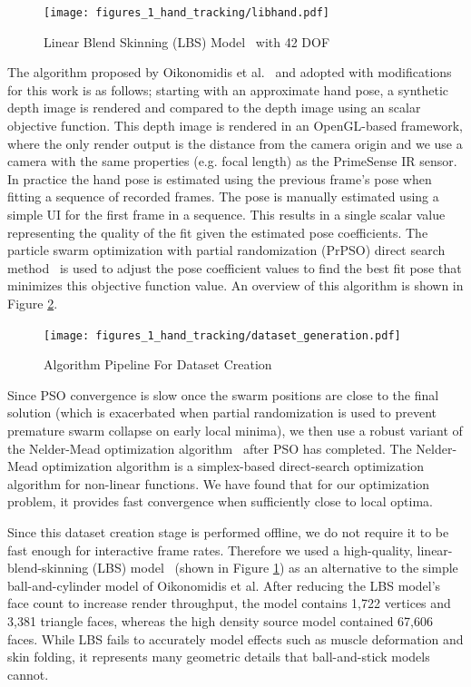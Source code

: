 \begin{figure}[ht]
\centering
\texttt{[image: figures\_1\_hand\_tracking/libhand.pdf]}
    \caption{Linear Blend Skinning (LBS) Model~\protect\cite{libhand} with 42 DOF}
    \label{fig:libhand}
\end{figure}

The algorithm proposed by Oikonomidis et al.~\cite{bmvc2011oikonom} and adopted with modifications for this work is as follows; starting with an approximate hand pose, a synthetic depth image is rendered and compared to the depth image using an scalar objective function. This depth image is rendered in an OpenGL-based framework, where the only render output is the distance from the camera origin and we use a camera with the same properties (e.g. focal length) as the PrimeSense IR sensor. In practice the hand pose is estimated using the previous frame's pose when fitting a sequence of recorded frames. The pose is manually estimated using a simple UI for the first frame in a sequence. This results in a single scalar value representing the quality of the fit given the estimated pose coefficients. The particle swarm optimization with partial randomization (PrPSO) direct search method~\cite{PRPSO} is used to adjust the pose coefficient values to find the best fit pose that minimizes this objective function value. An overview of this algorithm is shown in Figure \ref{fig:pso_architecture}.

\begin{figure}[ht]
\centering
\texttt{[image: figures\_1\_hand\_tracking/dataset\_generation.pdf]}
    \caption{Algorithm Pipeline For Dataset Creation}
    \label{fig:pso_architecture}
\end{figure}

Since PSO convergence is slow once the swarm positions are close to the final solution (which is exacerbated when partial randomization is used to prevent premature swarm collapse on early local minima), we then use a robust variant of the Nelder-Mead optimization algorithm~\cite{Tseng95fortified-descentsimplicial} after PSO has completed. The Nelder-Mead optimization algorithm is a simplex-based direct-search optimization algorithm for non-linear functions. We have found that for our optimization problem, it provides fast convergence when sufficiently close to local optima.

Since this dataset creation stage is performed offline, we do not require it to be fast enough for interactive frame rates. Therefore we used a high-quality, linear-blend-skinning (LBS) model~\cite{libhand} (shown in Figure \ref{fig:libhand}) as an alternative to the simple ball-and-cylinder model of Oikonomidis et al. After reducing the LBS model's face count to increase render throughput, the model contains 1,722 vertices and 3,381 triangle faces, whereas the high density source model contained 67,606 faces. While LBS fails to accurately model effects such as muscle deformation and skin folding, it represents many geometric details that ball-and-stick models cannot.

